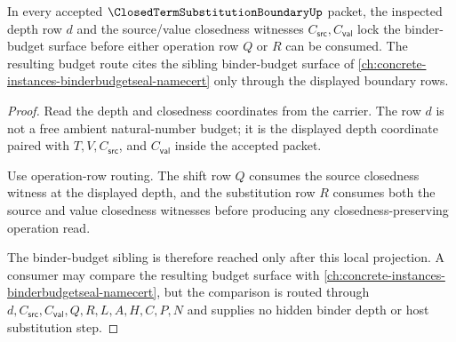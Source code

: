 \begin{theorem}
\label{thm:closed-term-substitution-boundary-binder-budget-depth-lock}
In every accepted $\ClosedTermSubstitutionBoundaryUp$ packet, the inspected depth row $d$ and the source/value closedness witnesses $C_{\mathsf{src}},C_{\mathsf{val}}$ lock the binder-budget surface before either operation row $Q$ or $R$ can be consumed. The resulting budget route cites the sibling binder-budget surface of \autoref{ch:concrete-instances-binderbudgetseal-namecert} only through the displayed boundary rows.
\end{theorem}
\begin{proof}
Read the depth and closedness coordinates from the carrier. The row $d$ is not a free ambient natural-number budget; it is the displayed depth coordinate paired with $T,V,C_{\mathsf{src}}$, and $C_{\mathsf{val}}$ inside the accepted packet.

Use operation-row routing. The shift row $Q$ consumes the source closedness witness at the displayed depth, and the substitution row $R$ consumes both the source and value closedness witnesses before producing any closedness-preserving operation read.

The binder-budget sibling is therefore reached only after this local projection. A consumer may compare the resulting budget surface with \autoref{ch:concrete-instances-binderbudgetseal-namecert}, but the comparison is routed through $d,C_{\mathsf{src}},C_{\mathsf{val}},Q,R,L,A,H,C,P,N$ and supplies no hidden binder depth or host substitution step.
\end{proof}

